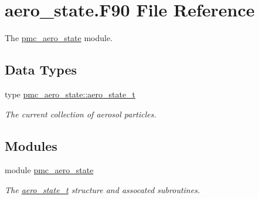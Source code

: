 \hypertarget{aero__state_8_f90}{}\section{aero\+\_\+state.\+F90 File Reference}
\label{aero__state_8_f90}


The \mbox{\hyperlink{namespacepmc__aero__state}{pmc\+\_\+aero\+\_\+state}} module.  


\subsection*{Data Types}
\begin{DoxyCompactItemize}
\item 
type \mbox{\hyperlink{structpmc__aero__state_1_1aero__state__t}{pmc\+\_\+aero\+\_\+state\+::aero\+\_\+state\+\_\+t}}
\begin{DoxyCompactList}\small\item\em The current collection of aerosol particles. \end{DoxyCompactList}\end{DoxyCompactItemize}
\subsection*{Modules}
\begin{DoxyCompactItemize}
\item 
module \mbox{\hyperlink{namespacepmc__aero__state}{pmc\+\_\+aero\+\_\+state}}
\begin{DoxyCompactList}\small\item\em The \mbox{\hyperlink{structpmc__aero__state_1_1aero__state__t}{aero\+\_\+state\+\_\+t}} structure and assocated subroutines. \end{DoxyCompactList}\end{DoxyCompactItemize}
